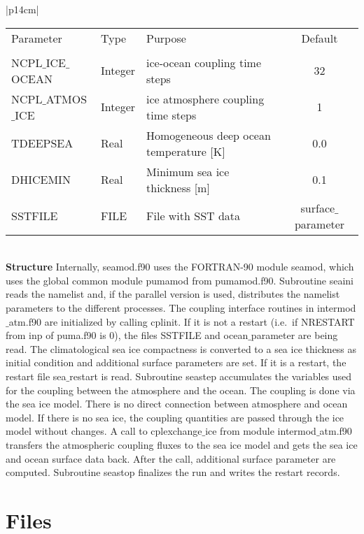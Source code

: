 \begin{center}
\begin{tabular}{|p{14cm}|}
\begin{center}
\begin{tabular}{l l p{5cm} c} %
Parameter & Type & Purpose & Default \\
&&&\\
NCPL$\_$ICE$\_$OCEAN& Integer & ice-ocean coupling time steps & 32 \\
NCPL$\_$ATMOS$\_$ICE & Integer & ice atmosphere coupling time steps & 1 \\
TDEEPSEA & Real &Homogeneous deep ocean temperature [K] & 0.0 \\
DHICEMIN & Real &  Minimum sea ice thickness [m] & 0.1 \\
SSTFILE &  FILE & File with SST data & surface$\_$parameter \\
\end{tabular} 
\end{center}
\vspace{3mm} \\
\hline
\vspace{2mm} {\bf Structure} Internally, {\module seamod.f90} uses the FORTRAN-90
module {\modu seamod}, which uses the global common module {\modu pumamod} from
{\module pumamod.f90}. Subroutine {\sub seaini} reads the namelist and, if the parallel
version is used,  distributes the namelist parameters to the different processes. The coupling
interface routines in {\module intermod$\_$atm.f90} are initialized by calling {\sub cplinit}.
If
it is not a restart (i.e.~if NRESTART from {\nam inp} of {\module puma.f90} is 0), the files
{\file SSTFILE} and {\file ocean$\_$parameter} are being read. The climatological sea ice
compactness is converted to a sea ice thickness as initial condition and additional   surface
parameters are set. If it is a restart, the restart file {\file sea$\_$restart} is read. Subroutine
{\sub
seastep} accumulates the variables used for the coupling between the atmosphere and the
ocean.
The coupling is done via the sea ice model. There is no direct connection between
atmosphere 
and ocean model. If there is no sea ice, the coupling quantities are passed through the ice
model
without changes. A call to {\sub cplexchange$\_$ice} from module {\module
intermod$\_$atm.f90} transfers the atmospheric coupling fluxes to the sea ice model and gets
the sea ice and ocean surface data back. After the call, additional surface parameter are
computed. Subroutine {\sub  seastop} finalizes the run and writes the restart records.
\vspace{3mm} \\
\hline
\end{tabular}
\end{center}
\newpage


\clearpage
\section{Files}











